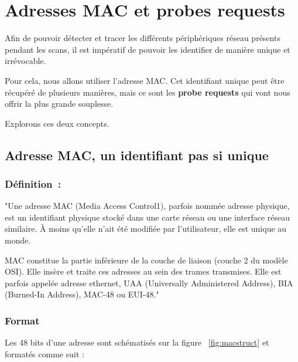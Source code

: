 \chapter{Adresses MAC et probes requests}
\label{ch:probe_req}

Afin de pouvoir détecter et tracer les différents périphériques réseau présents
pendant les scans, il est impératif de pouvoir les identifier de manière unique et irrévocable.

Pour cela, nous allons utiliser l'adresse MAC. 
Cet identifiant unique peut être récupéré de plusieurs manières, mais ce sont les \textbf{probe requests}
qui vont nous offrir la plus grande souplesse. 

Explorons ces deux concepts.

\section{Adresse MAC, un identifiant pas si unique}

\subsection{Définition~\cite{wiki:mac}:}

"Une adresse MAC (Media Access Control1), parfois nommée adresse physique, est un identifiant physique 
stocké dans une carte réseau ou une interface réseau similaire. À moins qu'elle n'ait été modifiée par l'utilisateur, elle est unique au monde. 

MAC constitue la partie inférieure de la couche de liaison (couche 2 du modèle OSI). Elle insère et traite ces adresses au sein des trames transmises. Elle est parfois appelée adresse ethernet, 
UAA (Universally Administered Address), BIA (Burned-In Address), MAC-48 ou EUI-48."

\subsection{Format}

Les 48 bits d'une adresse sont schématisés sur la figure ~\ref{fig:macstruct} et formatés comme suit :

